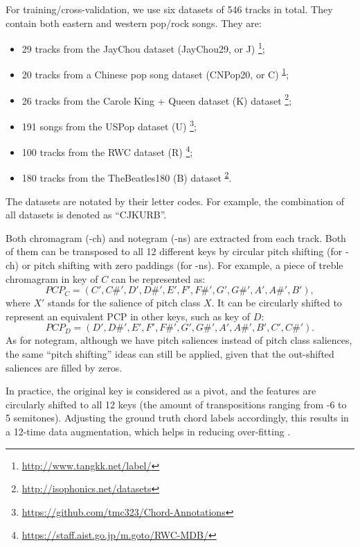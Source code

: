 For training/cross-validation, we use six datasets of 546 tracks in total. They contain both eastern and western pop/rock songs. They are:
\begin{itemize}
	\item 29 tracks from the JayChou dataset (JayChou29, or J) \footnote{\url{http://www.tangkk.net/label/}\label{f1}};
	\item 20 tracks from a Chinese pop song dataset (CNPop20, or C) \textsuperscript{\ref{f1}};
	\item 26 tracks from the Carole King + Queen dataset (K) dataset \footnote{\url{http://isophonics.net/datasets}\label{f2}};
	\item 191 songs from the USPop dataset (U) \footnote{\url{https://github.com/tmc323/Chord-Annotations}};
	\item 100 tracks from the RWC dataset (R) \footnote{\url{https://staff.aist.go.jp/m.goto/RWC-MDB/}};
	\item 180 tracks from the TheBeatles180 (B) dataset \textsuperscript{\ref{f2}}. 
\end{itemize}
The datasets are notated by their letter codes. For example, the combination of all datasets is denoted as ``CJKURB''.

Both chromagram (-ch) and notegram (-ns) are extracted from each track. Both of them can be transposed to all 12 different keys by circular pitch shifting (for -ch) or pitch shifting with zero paddings (for -ns). For example, a piece of treble chromagram in key of $C$ can be represented as:
\begin{equation}
PCP_C = (C',C\#', D', D\#', E', F', F\#', G', G\#', A', A\#', B'),
\end{equation}
where $X'$ stands for the salience of pitch class $X$. It can be circularly shifted to represent an equivalent PCP in other keys, such as key of $D$:
\begin{equation}
PCP_D = ( D', D\#', E', F', F\#', G', G\#', A', A\#', B', C',C\#').
\end{equation}
As for notegram, although we have pitch saliences instead of pitch class saliences, the same ``pitch shifting'' ideas can still be applied, given that the out-shifted saliences are filled by zeros.

In practice, the original key is considered as a pivot, and the features are circularly shifted to all 12 keys (the amount of transpositions ranging from -6 to 5 semitones). Adjusting the ground truth chord labels accordingly, this results in a 12-time data augmentation, which helps in reducing over-fitting \cite{cho2014improved,humphrey2015exploration}.

